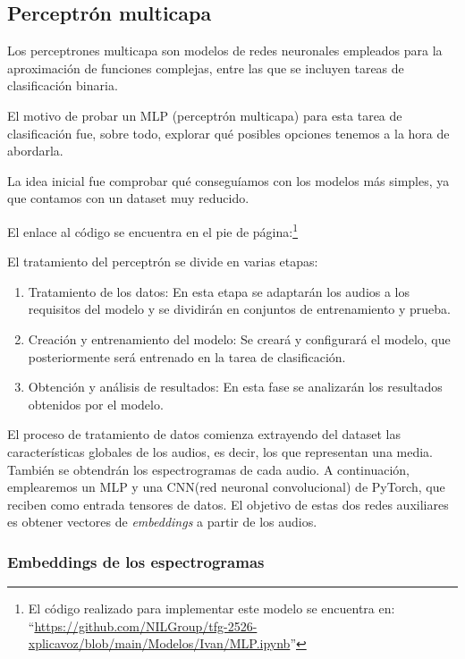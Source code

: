 \subsection{Perceptrón multicapa}

Los perceptrones multicapa son modelos de redes neuronales empleados para la aproximación de funciones complejas, entre las que se incluyen tareas de clasificación binaria.

El motivo de probar un MLP (perceptrón multicapa) para esta tarea de clasificación fue, sobre todo, explorar qué posibles opciones tenemos a la hora de abordarla.

La idea inicial fue comprobar qué conseguíamos con los modelos más simples, ya que contamos con un dataset muy reducido.

El enlace al código se encuentra en el pie de página:\footnote{El código realizado para implementar este modelo se encuentra en: ``\href{https://github.com/NILGroup/tfg-2526-xplicavoz/blob/main/Modelos/Ivan/MLP.ipynb}{https://github.com/NILGroup/tfg-2526-xplicavoz/blob/main/Modelos/Ivan/MLP.ipynb}''}

El tratamiento del perceptrón se divide en varias etapas:

\begin{enumerate}
 \item Tratamiento de los datos: En esta etapa se adaptarán los audios a los requisitos del modelo y se dividirán en conjuntos de entrenamiento y prueba.
 \item Creación y entrenamiento del modelo: Se creará y configurará el modelo, que posteriormente será entrenado en la tarea de clasificación.
 \item Obtención y análisis de resultados: En esta fase se analizarán los resultados obtenidos por el modelo.
\end{enumerate}

El proceso de tratamiento de datos comienza extrayendo del dataset las características globales de los audios, es decir, los que representan una media. También se obtendrán los espectrogramas de cada audio. A continuación, emplearemos un MLP y una CNN(red neuronal convolucional) de PyTorch, que reciben como entrada tensores de datos. El objetivo de estas dos redes auxiliares es obtener vectores de \textit{embeddings} a partir de los audios.

\subsubsection*{Embeddings de los espectrogramas}

